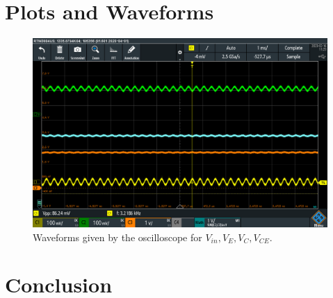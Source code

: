 \documentclass{article}
\begin{document}
		    
	\pagebreak
	\section*{Plots and Waveforms}
		\begin{figure}[H]
	    \includegraphics[width=14.9cm]{Oscilloscope}
	    \centering
	    \caption{Waveforms given by the oscilloscope for $V_{in}, V_{E}, V_{C}, V_{CE}$.}
	    \end{figure}
		
		
	\pagebreak	    
	\section*{Conclusion}
		
\end{document}
